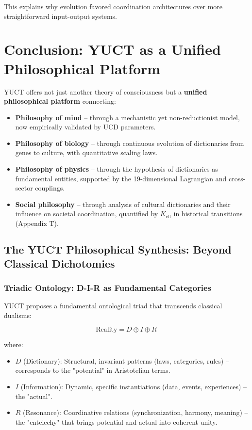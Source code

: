\documentclass[12pt,a4paper]{article}
\newcommand{\eff}{\mathrm{eff}}
\newcommand{\Ke}{K_{\eff}}
\begin{document}
	This explains why evolution favored coordination architectures over more straightforward input-output systems.
	
	\section{Conclusion: YUCT as a Unified Philosophical Platform}
	
	YUCT offers not just another theory of consciousness but a \textbf{unified philosophical platform} connecting:
	\begin{itemize}
		\item \textbf{Philosophy of mind} – through a mechanistic yet non-reductionist model, now empirically validated by UCD parameters.
		\item \textbf{Philosophy of biology} – through continuous evolution of dictionaries from genes to culture, with quantitative scaling laws.
		\item \textbf{Philosophy of physics} – through the hypothesis of dictionaries as fundamental entities, supported by the 19‑dimensional Lagrangian and cross-sector couplings.
		\item \textbf{Social philosophy} – through analysis of cultural dictionaries and their influence on societal coordination, quantified by $\Ke$ in historical transitions (Appendix T).
	\end{itemize}
	
	\subsection{The YUCT Philosophical Synthesis: Beyond Classical Dichotomies}
	
	\subsubsection{Triadic Ontology: D-I-R as Fundamental Categories}
	
	YUCT proposes a fundamental ontological triad that transcends classical dualisms:
	
	\[
	\text{Reality} = D \oplus I \oplus R
	\]
	
	where:
	\begin{itemize}
		\item $D$ (Dictionary): Structural, invariant patterns (laws, categories, rules) – corresponds to the "potential" in Aristotelian terms.
		\item $I$ (Information): Dynamic, specific instantiations (data, events, experiences) – the "actual".
		\item $R$ (Resonance): Coordinative relations (synchronization, harmony, meaning) – the "entelechy" that brings potential and actual into coherent unity.
	\end{itemize}
	
\end{document}
